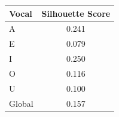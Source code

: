 \begin{tabular}{lc}
\toprule
\rowcolor{col01}
Vocal & Silhouette Score \\
\midrule
A & 0.241 \\
E & 0.079 \\
I & 0.250 \\
O & 0.116 \\
U & 0.100 \\
Global & 0.157 \\
\bottomrule
\end{tabular}
